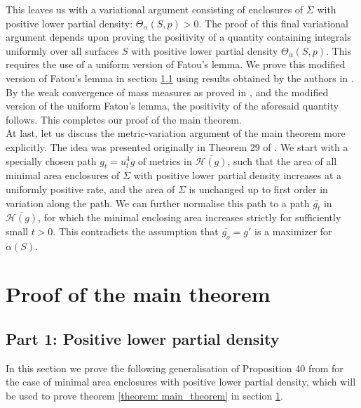 \documentclass{amsart}
\newcommand{\s}{\Sigma}
\newcommand{\gh}{\overline{\mathcal{H}(g)}}
\theoremstyle{named}
\begin{document}
This leaves us with a variational argument consisting of enclosures of $\s$ with positive lower partial density: $\Theta_{\alpha}(S,p) > 0$. The proof of this final variational argument depends upon proving the positivity of a quantity containing integrals uniformly over all surfaces $S$ with positive lower partial density $\Theta_{\alpha}(S,p)$. This requires the use of a uniform version of Fatou's lemma. We prove this modified version of Fatou's lemma in section \ref{section: positive_partial_density} using results obtained by the authors in \cite{feinberg2015uniform}. By the weak convergence of mass measures as proved in \cite{jeff}, and the modified version of the uniform Fatou's lemma, the positivity of the aforesaid quantity follows. This completes our proof of the main theorem.\\ 

At last, let us discuss the metric-variation argument of the main theorem more explicitly. The idea was presented originally in Theorem 29 of \cite{jeff}. We start with a specially chosen path $g_t = u_t^4g$ of metrics in $\gh$, such that the area of all minimal area enclosures of $\s$ with positive lower partial density increases at a uniformly positive rate, and the area of $\s$ is unchanged up to first order in variation along the path. We can further normalise this path to a path $\overline{g_t}$ in $\gh$, for which the minimal enclosing area increases strictly for sufficiently small $t>0$. This contradicts the assumption that $\overline{g_o} = g'$ is a maximizer for $\alpha(S)$. 


\section{Proof of the main theorem} \label{section: proof}


\subsection{Part 1: Positive lower partial density} \label{section: positive_partial_density}

In this section we prove the following generalisation of Proposition 40 from \cite{jeff} for the case of minimal area enclosures with positive lower partial density, which will be used to prove theorem \ref{theorem: main_theorem} in section \ref{section: proof}.
\end{document}
